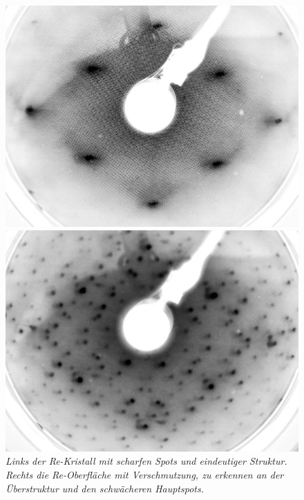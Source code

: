 \begin{figure}[htbp]
	\begin{minipage}[b]{0.5\textwidth} 
		\includegraphics[width=\textwidth]{LEED-Bilder/bearbeitet/unbedampft_E207}
	\end{minipage}
	\hfill
	\begin{minipage}[b]{0.5\textwidth}
		\includegraphics[width=\textwidth]{LEED-Bilder/bearbeitet/unbedampft_E207_MitteKristall.jpg}
	\end{minipage}
	\caption{\textit{Links der Re-Kristall mit scharfen Spots und eindeutiger Struktur. Rechts die
	Re-Oberfläche mit Verschmutzung, zu erkennen an der Überstruktur und den schwächeren Hauptspots.}}
	\label{rekristall} 
\end{figure}

